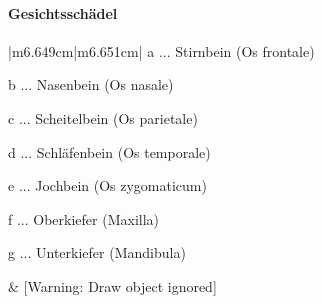 \documentclass{article}
\begin{document}
\paragraph[Gesichtssch\"adel]{Gesichtssch\"adel}
\begin{center}
\tablehead{}\begin{supertabular}{|m{6.649cm}|m{6.651cm}|}
\hline
a ... Stirnbein (Os frontale)

b ... Nasenbein (Os nasale)

c ... Scheitelbein (Os parietale)

d ... Schl\"afenbein (Os temporale)

e ... Jochbein (Os zygomaticum)

f ... Oberkiefer (Maxilla)

g ... Unterkiefer (Mandibula)

 &
[Warning: Draw object ignored]

\\\hline
\end{supertabular}
\end{center}
\end{document}

